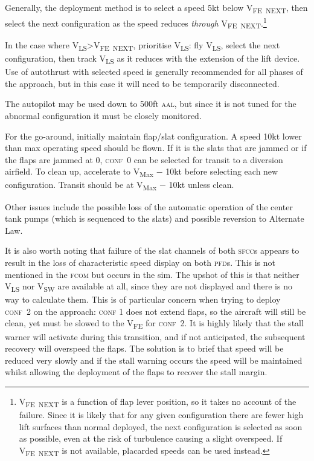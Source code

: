 \documentclass[a5paper,11pt,twoside]{book}
\newcommand{\ac}[1]{{\scshape\MakeLowercase{#1}}}
\newcommand{\V}[1]{V\textsubscript{#1}}
\begin{document}
Generally, the deployment method is to select a speed 5kt below \V{FE~NEXT},
then select the next configuration as the speed reduces \emph{through}
\V{FE~NEXT}.\footnote{\V{FE~NEXT} is a function of flap lever position, so it
takes no account of the failure. Since it is likely that for any given
configuration there are fewer high lift surfaces than normal deployed, the next
configuration is selected as soon as possible, even at the risk of turbulence
causing a slight overspeed. If \V{FE~NEXT} is not available, placarded speeds
can be used instead.}

In the case where \V{LS}>\V{FE~NEXT}, prioritise \V{LS}: fly \V{LS}, select the
next configuration, then track \V{LS} as it reduces with the extension of the
lift device. Use of autothrust with selected speed is generally recommended for
all phases of the approach, but in this case it will need to be temporarily
disconnected.

The autopilot may be used down to 500ft \ac{AAL}, but since it is not tuned for
the abnormal configuration it must be closely monitored.

For the go-around, initially maintain flap/slat configuration. A speed 10kt
lower than max operating speed should be flown. If it is the slats that are
jammed or if the flaps are jammed at 0, \ac{conf}~0 can be selected for transit
to a diversion airfield. To clean up, accelerate to \V{Max} $-$ 10kt before
selecting each new configuration. Transit should be at \V{Max} $-$ 10kt unless
clean.

Other issues include the possible loss of the automatic operation of the center
tank pumps (which is sequenced to the slats) and possible reversion to Alternate
Law.

It is also worth noting that failure of the slat channels of both \ac{SFCC}s
appears to result in the loss of characteristic speed display on both
\ac{PFD}s. This is not mentioned in the \ac{FCOM} but occurs in the sim. The
upshot of this is that neither \V{LS} nor \V{SW} are available at all, since
they are not displayed and there is no way to calculate them. This is of
particular concern when trying to deploy \ac{conf}~2 on the approach: \ac{conf}
1 does not extend flaps, so the aircraft will still be clean, yet must be slowed
to the \V{FE} for \ac{conf}~2. It is highly likely that the stall warner will
activate during this transition, and if not anticipated, the subsequent recovery
will overspeed the flaps. The solution is to brief that speed will be reduced
very slowly and if the stall warning occurs the speed will be maintained whilst
allowing the deployment of the flaps to recover the stall margin.
\end{document}
